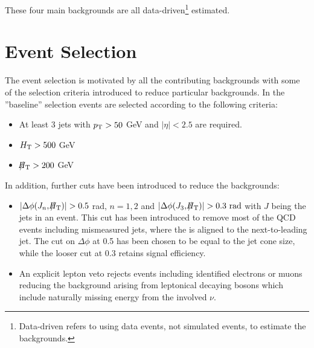These four main backgrounds are all data-driven\footnote{Data-driven refers to using data events, not simulated events, to estimate the backgrounds.} estimated. 





\section{Event Selection}
\label{sec:event_selection}
The event selection is motivated by all the contributing backgrounds with some of the selection criteria introduced to reduce particular backgrounds.
In the ''baseline'' selection events are selected according to the following criteria:
\begin{itemize}
 \item At least 3 jets with $p_{\text{T}} > 50$ GeV and $|\eta| < 2.5$ are required.  
 \item $H_{\text{T}} > 500$ GeV
 \item $\slash\mkern-12mu{H}_{\text{T}} > 200$ GeV
\end{itemize}
In addition, further cuts have been introduced to reduce the backgrounds:
\begin{itemize}
 \item $ | \Delta \phi ( J_{n} , \slash\mkern-12mu{H}_{\text{T}} ) | > 0.5$ rad, $n=1,2$ and $ | \Delta\phi ( J_{3} , \slash\mkern-12mu{H}_{\text{T}} ) | > 0.3 \text{ rad}$ with $J$ being the jets in an event.
      This cut has been introduced to remove most of the QCD events including mismeasured jets, where the \MHT  is aligned to the next-to-leading jet. The cut on $ \Delta\phi $ at 0.5 has been chosen to be equal to the jet cone size, while the looser cut at 0.3 retains signal efficiency.
 \item An explicit lepton veto rejects events including identified electrons or muons reducing the background arising from leptonical decaying \W bosons which include naturally missing energy from the involved $\nu$. 
\end{itemize}

